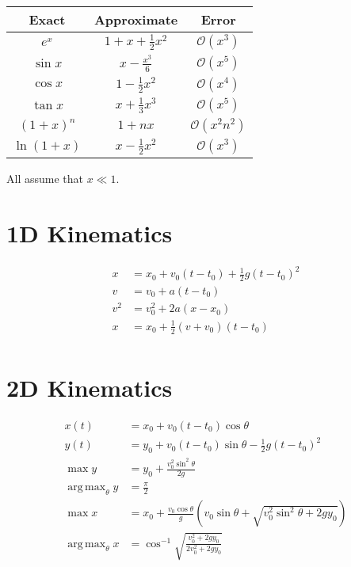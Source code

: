 \documentclass[12pt]{article}
\DeclareMathOperator*{\argmax}{arg\,max}
\begin{document}
\begin{center}
    \begin{tabular}{ ||c|c|c|| } 
        \hline
        \hline
        \textbf{ Exact } & \textbf{Approximate} & \textbf{Error} \\ 
        \hline
        \hline
        $e^{x}$ & $1 + x + \frac{1}{2} x^2$ & $\mathcal{O} \left (x^3 \right)$ \\
        \hline
        $\sin{x}$ & $x - \frac{x^3}{6}$ & $\mathcal{O} \left (x^5 \right)$ \\
        \hline
        $\cos{x}$ & $1 - \frac{1}{2} x^2 $ & $\mathcal{O}(x^4)$ \\
        \hline
        $\tan{x}$ & $x + \frac{1}{3} x^3 $ & $\mathcal{O} (x^5)$\\
        \hline
        $\left (1 + x \right)^n$ & $1 + nx$ & $\mathcal{O} (x^2 n^2)$ \\
        \hline
        $\ln{\left (1 + x \right)}$ & $x - \frac{1}{2} x^2$ & $\mathcal{O}(x^3)$ \\
        \hline
        \hline
    \end{tabular}
\end{center}
All assume that $x \ll 1$.


\section{1D Kinematics}
\begin{align*}
    x &= x_0 + v_0 \left (t - t_0 \right ) + \frac{1}{2} g \left ( t - t_0 \right )^2 \\
    v &= v_0 + a \left (t - t _0 \right) \\
    v^2 &= v_0^2 + 2a \left (x - x_0 \right) \\
    x &= x_0 + \frac{1}{2} \left ( v + v_0 \right) \left ( t - t_0 \right) \\
\end{align*}

\section{2D Kinematics}
\begin{align*}
    x(t) &= x_0 + v_0 \left (t - t_0 \right) \cos{\theta} \\
    y(t) &= y_0 + v_0 \left (t - t_0 \right) \sin{\theta} - \frac{1}{2} g\left (t - t_0 \right)^2 \\
    \max{y} &= y_0 + \frac{v_0^2 \sin^2{\theta}}{2g} \\
    \argmax_{\theta}{y} &= \frac{\pi}{2} \\
    \max{x} &= x_0 + \frac{v_0 \cos{\theta}}{g} \left (v_0 \sin{\theta} + \sqrt{v_0^2 \sin^2{\theta} + 2gy_0} \right) \\
    \argmax_{\theta}{x} &= \cos^{-1} \sqrt{\frac{v_0^2 + 2gy_0}{2v_0^2 + 2gy_0}} \\
\end{align*}
\end{document}
